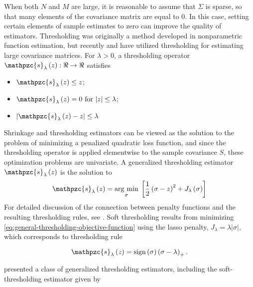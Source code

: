 
When both $N$ and $M$ are large, it is reasonable to assume that $\Sigma$ is sparse, so that many elements of the covariance matrix are equal to 0. In this case, setting certain elements of sample estimates to zero can improve the quality of estimators. Thresholding was originally a method developed in nonparametric function estimation, but recently \citet{bickel2008covariance} and \citet{rothman2009generalized} have utilized thresholding for estimating large covariance matrices.  For $\lambda > 0$, a thresholding operator $\mathpzc{s}_\lambda\left( z \right): \Re \rightarrow \Re$ satisfies 
\begin{itemize}
\item $\mathpzc{s}_\lambda\left( z \right) \le z$;
\item $\mathpzc{s}_\lambda\left( z \right) = 0 \mbox{ for } \vert z\vert \le \lambda$;
\item $\vert \mathpzc{s}_\lambda\left( z \right) - z \vert \le \lambda$
\end{itemize}

Shrinkage and thresholding estimators can be viewed as the solution to the problem of minimizing a penalized quadratic loss function, and since the thresholding operator is applied elementwise to the sample covariance $S$,  these optimization problems are univariate. A generalized thresholding estimator $\mathpzc{s}_\lambda\left( z \right)$ is the solution to
\begin{equation} \label{eq:general-thresholding-objective-function}
\mathpzc{s}_\lambda\left( z \right)  = \argmin{\sigma} \left[ \frac{1}{2} \left(\sigma - z\right)^2 + J_\lambda\left(\sigma \right)\right]
\end{equation}
\noindent
For detailed discussion of the connection between penalty functions and the resulting thresholding rules, see \citet{antoniadis2001regularization}. Soft thresholding results from minimizing \ref{eq:general-thresholding-objective-function} using the lasso penalty, $J_\lambda = \lambda \vert \sigma \vert$, which corresponds to thresholding rule

\begin{equation} 
\mathpzc{s}_\lambda\left( z \right) = \textup{sign}\left(\sigma\right) \left(\sigma  - \lambda\right)_+.
\end{equation}

\citet{rothman2009generalized} presented a class of generalized thresholding estimators, including the soft-thresholding estimator given by

